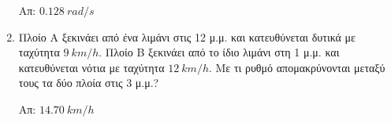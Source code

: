 \begin{enumerate}
    \hfill Απ: $\SI{0.128}{rad/s}$

  \item  Πλοίο Α ξεκινάει από ένα λιμάνι στις 12 μ.μ. και κατευθύνεται δυτικά
    με ταχύτητα  $\SI{9}{km/h}$. Πλοίο Β ξεκινάει από το ίδιο λιμάνι στη 1
    μ.μ. και κατευθύνεται νότια με ταχύτητα $\SI{12}{km/h}$. Με τι ρυθμό
    απομακρύνονται μεταξύ τους τα δύο πλοία στις 3 μ.μ.?

    \hfill Απ: $\SI{14,70}{km/h}$
\end{enumerate}



